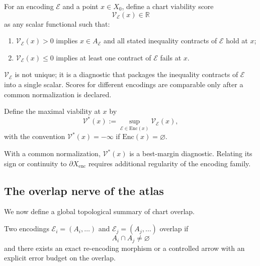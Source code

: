 \documentclass[11pt]{article}
\theoremstyle{plain}
\theoremstyle{plain}
\begin{document}
\begin{definition}
For an encoding $\mathcal{E}$ and a point $x\in X_0$, define a chart viability score
\[
\mathcal{V}_{\mathcal{E}}(x) \in \mathbb{R}
\]
as any scalar functional such that:
\begin{enumerate}
\item $\mathcal{V}_{\mathcal{E}}(x)>0$ implies $x\in A_{\mathcal{E}}$ and all stated
      inequality contracts of $\mathcal{E}$ hold at $x$;
\item $\mathcal{V}_{\mathcal{E}}(x)\le 0$ implies at least one contract of $\mathcal{E}$ fails at $x$.
\end{enumerate}
\end{definition}

\begin{remark}
$\mathcal{V}_{\mathcal{E}}$ is not unique; it is a diagnostic that packages the
inequality contracts of $\mathcal{E}$ into a single scalar.  Scores for
different encodings are comparable only after a common normalization is
declared.
\end{remark}

\begin{definition}
Define the maximal viability at $x$ by
\[
\mathcal{V}^\ast(x) := \sup_{\mathcal{E}\in \mathrm{Enc}(x)} \mathcal{V}_{\mathcal{E}}(x),
\]
with the convention $\mathcal{V}^\ast(x)=-\infty$ if $\mathrm{Enc}(x)=\varnothing$.
\end{definition}

\begin{remark}
With a common normalization, $\mathcal{V}^\ast(x)$ is a best-margin
diagnostic.  Relating its sign or continuity to
$\partial X_{\mathrm{enc}}$ requires additional regularity of the encoding
family.
\end{remark}

\subsection{The overlap nerve of the atlas}

We now define a global topological summary of chart overlap.

\begin{definition}
Two encodings $\mathcal{E}_i=(A_i,\dots)$ and $\mathcal{E}_j=(A_j,\dots)$ overlap if
\[
A_i\cap A_j \neq \varnothing
\]
and there exists an exact re-encoding morphism or a controlled arrow with an
explicit error budget on the overlap.
\end{definition}
\end{document}
